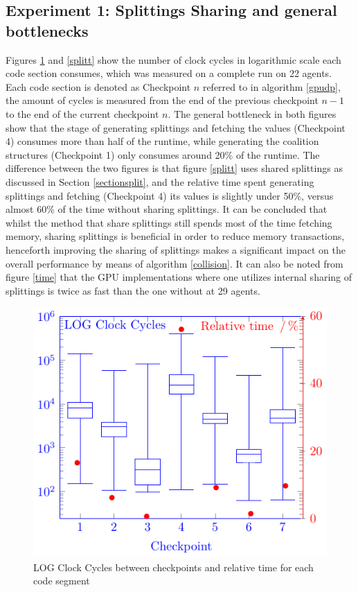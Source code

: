 \documentclass{llncs}
\begin{document}
\subsection{Experiment 1: Splittings Sharing and general bottlenecks} %
Figures \ref{nosplitt} and \ref{splitt} show the number of clock cycles in logarithmic scale each code section consumes,
which was measured on a complete run on 22 agents.
Each code section is denoted as Checkpoint $n$ referred to in algorithm \ref{gpudp}, the amount of cycles is measured from
the end of the previous checkpoint $n-1$ to the end of the current checkpoint $n$. 
The general bottleneck in both figures show that the stage of generating splittings and fetching the values (Checkpoint 4) consumes 
more than half of the runtime, while generating the coalition structures (Checkpoint 1) only consumes around 20\% of the runtime.
The difference between the two figures is that figure \ref{splitt} uses shared splittings as discussed in Section \ref{sectionsplit}, 
and the relative time spent generating splittings and fetching (Checkpoint 4) its values is slightly under 50\%, versus almost 60\%
of the time without sharing splittings. It can be concluded that whilst the method that share splittings still spends most of the time fetching memory, sharing splittings is beneficial in order to reduce memory transactions, henceforth improving the sharing of splittings makes a significant impact on the overall performance by means of algorithm \ref{collision}. It can also be noted from figure \ref{time} that the GPU implementations where one utilizes internal sharing of splittings is twice as fast than the one without at 29 agents.
\begin{figure}[htbp]\centering
\includegraphics[width=0.8\columnwidth]{fig3cycles}
\caption{LOG Clock Cycles between checkpoints and relative time for each code segment\label{nosplitt}}
\end{figure}
\end{document}
